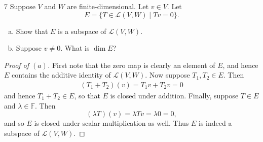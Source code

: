 \documentclass{extarticle}
\newenvironment{problem}[1]{\begin{prob*}{#1}{}}{\end{prob*}}
\newcommand{\F}{\mathbb{F}}
\newcommand{\Hom}{\mathcal{L}}
\begin{document}
\begin{problem}{7}
Suppose $V$ and $W$ are finite-dimensional.  Let $v\in V$.  Let 
\begin{equation*}
E = \{T\in \Hom(V,W)\mid Tv = 0\}.
\end{equation*}
\begin{enumerate}[(a)]
\item Show that $E$ is a subspace of $\Hom(V,W)$.
\item Suppose $v\neq 0$.  What is $\dim E$?
\end{enumerate}
\end{problem}
\begin{proof}[Proof of $(a)$]
First note that the zero map is clearly an element of $E$, and hence $E$ contains the additive identity of $\Hom(V,W)$.  Now suppose $T_1,T_2\in E$.  Then 
\begin{align*}
(T_1 + T_2)(v) = T_1v + T_2v = 0
\end{align*}
and hence $T_1 + T_2\in E$, so that $E$ is closed under addition.  Finally, suppose $T\in E$ and $\lambda\in\F$.  Then
\begin{equation*}
(\lambda T)(v) = \lambda Tv = \lambda 0 = 0,
\end{equation*}
and so $E$ is closed under scalar multiplication as well.  Thus $E$ is indeed a subspace of $\Hom(V,W)$.  
\end{proof}
\end{document}
